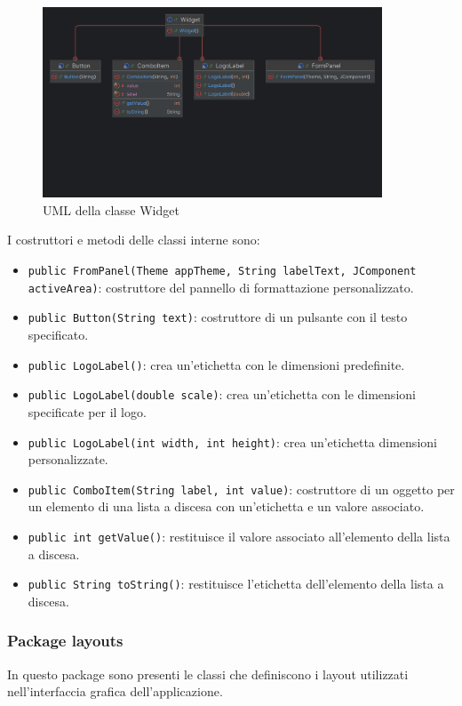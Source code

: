 \begin{figure}[H]
    \centering
    \includegraphics[width=0.9\textwidth]{img/UMLWidget.png}
    \caption{UML della classe Widget}
    \label{fig:UMLWidget}
\end{figure}
I costruttori e metodi delle classi interne sono:
\begin{itemize}
    \item \texttt{public FromPanel(Theme appTheme, String labelText, JComponent activeArea)}: costruttore del pannello di formattazione personalizzato.
    \item \texttt{public Button(String text)}: costruttore di un pulsante con il testo specificato.
    \item \texttt{public LogoLabel()}: crea un'etichetta con le dimensioni predefinite.
    \item \texttt{public LogoLabel(double scale)}: crea un'etichetta con le dimensioni specificate per il logo.
    \item \texttt{public LogoLabel(int width, int height)}: crea un'etichetta dimensioni personalizzate.
    \item \texttt{public ComboItem(String label, int value)}: costruttore di un oggetto per un elemento di una lista a discesa con un'etichetta e un valore associato.
    \item \texttt{public int getValue()}: restituisce il valore associato all'elemento della lista a discesa.
    \item \texttt{public String toString()}: restituisce l'etichetta dell'elemento della lista a discesa.
\end{itemize}

\subsubsection{Package layouts}
In questo package sono presenti le classi che definiscono i layout utilizzati nell'interfaccia grafica dell'applicazione.

